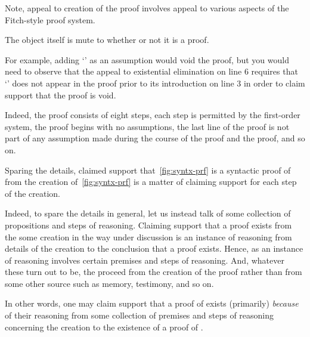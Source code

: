 \begin{note}
  Note, appeal to creation of the proof involves appeal to various aspects of the Fitch-style proof system.

  The object itself is mute to whether or not it is a proof.

  For example, adding `' as an assumption would void the proof, but you would need to observe that the appeal to existential elimination on line 6 requires that `' does not appear in the proof prior to its introduction on line 3 in order to claim support that the proof is void.

  Indeed, the proof consists of eight steps, each step is permitted by the first-order system, the proof begins with no assumptions, the last line of the proof is not part of any assumption made during the course of the proof and the proof, and so on.

  Sparing the details, claimed support that~\autoref{fig:syntx-prf} is a syntactic proof of  from the creation of~\autoref{fig:syntx-prf} is a matter of claiming support for each step of the creation.

  Indeed, to spare the details in general, let us instead talk of some collection of propositions and steps of reasoning.
  Claiming support that a proof exists from the some creation in the way under discussion is an instance of reasoning from details of the creation to the conclusion that a proof exists.
  Hence, as an instance of reasoning involves certain premises and steps of reasoning.
  And, whatever these turn out to be, the proceed from the creation of the proof rather than from some other source such as memory, testimony, and so on.
\end{note}

\begin{note}
  In other words, one may claim support that a proof of  exists (primarily) \emph{because} of their reasoning from some collection of premises and steps of reasoning concerning the creation to the existence of a proof of .
\end{note}

